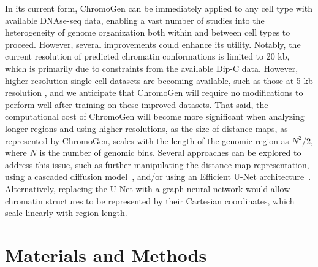 \documentclass[12pt,letterpaper]{article}
\begin{document}
In its current form, ChromoGen can be immediately applied to any cell type with available DNAse-seq data, enabling a vast number of studies into the heterogeneity of genome organization both within and between cell types to proceed. However, several improvements could enhance its utility. %
Notably, the current resolution of predicted chromatin conformations is limited to 20 kb, which is primarily due to constraints from the available Dip-C data. 
However, higher-resolution single-cell datasets are becoming available, such as those at 5 kb resolution \cite{Wu2023}, and we anticipate that ChromoGen will require no modifications to perform well after training on these improved datasets. 
That said, the computational cost of ChromoGen will become more significant when analyzing longer regions and using higher resolutions, as the size of distance maps, as represented by ChromoGen, scales with the length of the genomic region as $N^2/2$, where $N$ is the number of genomic bins. 
Several approaches can be explored to address this issue, such as further manipulating the distance map representation, using a cascaded diffusion model~\cite{Ho2022}, and/or using an Efficient U-Net architecture~\cite{Saharia2022}.
Alternatively, replacing the U-Net with a graph neural network \cite{ingraham2023Illuminating,Airas2023b,arts2023Two} would allow chromatin structures to be represented by their Cartesian coordinates, which scale linearly with region length. 

\section*{Materials and Methods}
\label{sec:Methods}
\end{document}

